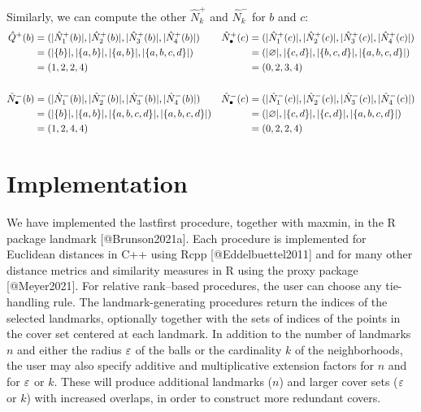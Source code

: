 \documentclass[
]{article}
\begin{document}
\begin{example}
Similarly, we can compute the other $\hat{N}_k^+$ and $\hat{N}_k^-$ for $b$ and $c$:
\begin{align*}
    \hat{Q}^+ (b) &= (\lvert \hat{N}^+_1(b)\rvert, \lvert \hat{N}^+_2(b)\rvert, \lvert \hat{N}^+_3(b)\rvert, \lvert \hat{N}^+_4(b)\rvert) &
    \hat{N}_\bullet^+ (c) &= (\lvert \hat{N}^+_1(c)\rvert, \lvert \hat{N}^+_2(c)\rvert, \lvert \hat{N}^+_3(c)\rvert, \lvert \hat{N}^+_4(c)\rvert) \\
        &= (\lvert \{b\}\rvert, \lvert \{a, b\}\rvert, \lvert \{a, b\}\rvert, \lvert \{a, b, c, d\}\rvert) &
        &= (\lvert \varnothing\rvert, \lvert \{c, d\}\rvert, \lvert \{b, c, d\}\rvert, \lvert \{a, b, c, d\}\rvert) \\
        &= (1, 2, 2, 4) &
        &= (0, 2, 3, 4) \\
        \\
    \hat{N}_\bullet^- (b) &= (\lvert \hat{N}^-_1(b)\rvert, \lvert \hat{N}^-_2(b)\rvert, \lvert \hat{N}^-_3(b)\rvert, \lvert \hat{N}^-_4(b)\rvert) &
    \hat{N}_\bullet^- (c) &= (\lvert \hat{N}^-_1(c)\rvert, \lvert \hat{N}^-_2(c)\rvert, \lvert \hat{N}^-_3(c)\rvert, \lvert \hat{N}^-_4(c)\rvert) \\
        &= (\lvert \{b\}\rvert, \lvert \{a, b\}\rvert, \lvert \{a, b, c, d\}\rvert, \lvert \{a, b, c, d\}\rvert) &
        &= (\lvert \varnothing\rvert, \lvert \{c, d\}\rvert, \lvert \{c, d\}\rvert, \lvert \{a, b, c, d\}\rvert) \\
        &= (1, 2, 4, 4) &&= (0, 2, 2, 4)
\end{align*}
\end{example}

\hypertarget{implementation}{%
\section{Implementation}\label{implementation}}

\label{sec:implementation}

We have implemented the lastfirst procedure, together with maxmin, in
the R package landmark {[}@Brunson2021a{]}. Each procedure is
implemented for Euclidean distances in C++ using Rcpp
{[}@Eddelbuettel2011{]} and for many other distance metrics and
similarity measures in R using the proxy package {[}@Meyer2021{]}. For
relative rank--based procedures, the user can choose any tie-handling
rule. The landmark-generating procedures return the indices of the
selected landmarks, optionally together with the sets of indices of the
points in the cover set centered at each landmark. In addition to the
number of landmarks \(n\) and either the radius \(\varepsilon\) of the balls or
the cardinality \(k\) of the neighborhoods, the user may also specify
additive and multiplicative extension factors for \(n\) and for \(\varepsilon\)
or \(k\). These will produce additional landmarks (\(n\)) and larger
cover sets (\(\varepsilon\) or \(k\)) with increased overlaps, in order to
construct more redundant covers.
\end{document}
